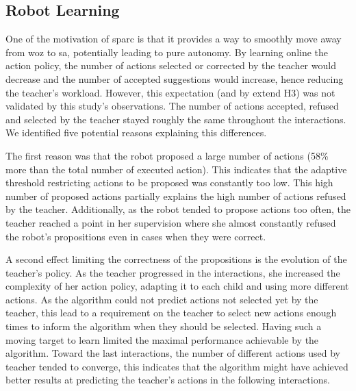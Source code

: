 \subsection{Robot Learning}

One of the motivation of \gls{sparc} is that it provides a way to smoothly move away from \gls{woz} to \gls{sa}, potentially leading to pure autonomy. By learning online the action policy, the number of actions selected or corrected by the teacher would decrease and the number of accepted suggestions would increase, hence reducing the teacher's workload. However, this expectation (and by extend H3) was not validated by this study's observations. The number of actions accepted, refused and selected by the teacher stayed roughly the same throughout the interactions. We identified five potential reasons explaining this differences.

The first reason was that the robot proposed a large number of actions (58\% more than the total number of executed action). This indicates that the adaptive threshold restricting actions to be proposed was constantly too low. This high number of proposed actions partially explains the high number of actions refused by the teacher. Additionally, as the robot tended to propose actions too often, the teacher reached a point in her supervision where she almost constantly refused the robot's propositions even in cases when they were correct. 

A second effect limiting the correctness of the propositions is the evolution of the teacher's policy. As the teacher progressed in the interactions, she increased the complexity of her action policy, adapting it to each child and using more different actions. As the algorithm could not predict actions not selected yet by the teacher, this lead to a requirement on the teacher to select new actions enough times to inform the algorithm when they should be selected. Having such a moving target to learn limited the maximal performance achievable by the algorithm. Toward the last interactions, the number of different actions used by teacher tended to converge, this indicates that the algorithm might have achieved better results at predicting the teacher's actions in the following interactions.


